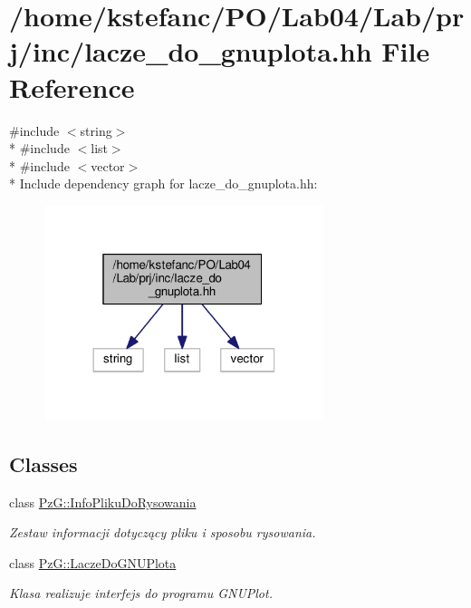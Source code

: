 \hypertarget{lacze__do__gnuplota_8hh}{\section{/home/kstefanc/\+P\+O/\+Lab04/\+Lab/prj/inc/lacze\+\_\+do\+\_\+gnuplota.hh File Reference}
\label{lacze__do__gnuplota_8hh}
}
{\ttfamily \#include $<$string$>$}\\*
{\ttfamily \#include $<$list$>$}\\*
{\ttfamily \#include $<$vector$>$}\\*
Include dependency graph for lacze\+\_\+do\+\_\+gnuplota.\+hh\+:\nopagebreak
\begin{figure}[H]
\begin{center}
\leavevmode
\includegraphics[width=230pt]{lacze__do__gnuplota_8hh__incl}
\end{center}
\end{figure}
\subsection*{Classes}
\begin{DoxyCompactItemize}
\item 
class \hyperlink{class_pz_g_1_1_info_pliku_do_rysowania}{Pz\+G\+::\+Info\+Pliku\+Do\+Rysowania}
\begin{DoxyCompactList}\small\item\em Zestaw informacji dotyczący pliku i sposobu rysowania. \end{DoxyCompactList}\item 
class \hyperlink{class_pz_g_1_1_lacze_do_g_n_u_plota}{Pz\+G\+::\+Lacze\+Do\+G\+N\+U\+Plota}
\begin{DoxyCompactList}\small\item\em Klasa realizuje interfejs do programu G\+N\+U\+Plot. \end{DoxyCompactList}\end{DoxyCompactItemize}

